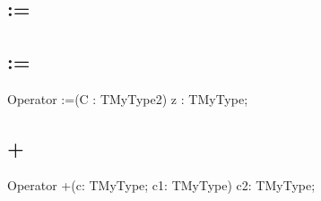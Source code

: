\documentclass{report}
\newif\ifpdf
\begin{document}
\subsection*{\large{\textbf{:=}}\normalsize\hspace{1ex}\hrulefill}
\else
\subsection*{:=}
\fi
\label{ok_operator_test-:=}
\index{:=}
\begin{list}{}{
\setlength{\itemindent}{0cm}
\setlength{\listparindent}{0cm}
\setlength{\leftmargin}{\evensidemargin}
\addtolength{\leftmargin}{\tmplength}
\settowidth{\labelsep}{X}
\addtolength{\leftmargin}{\labelsep}
\setlength{\labelwidth}{\tmplength}
}
\item[\textbf{Declaration}\hfill]
\ifpdf
\begin{flushleft}
\fi
\begin{ttfamily}
Operator :=(C : TMyType2) z : TMyType;\end{ttfamily}

\ifpdf
\end{flushleft}
\fi

\end{list}
\ifpdf
\subsection*{\large{\textbf{+}}\normalsize\hspace{1ex}\hrulefill}
\else
\subsection*{+}
\fi
\label{ok_operator_test-+}
\index{+}
\begin{list}{}{
\setlength{\itemindent}{0cm}
\setlength{\listparindent}{0cm}
\setlength{\leftmargin}{\evensidemargin}
\addtolength{\leftmargin}{\tmplength}
\settowidth{\labelsep}{X}
\addtolength{\leftmargin}{\labelsep}
\setlength{\labelwidth}{\tmplength}
}
\item[\textbf{Declaration}\hfill]
\ifpdf
\begin{flushleft}
\fi
\begin{ttfamily}
Operator +(c: TMyType; c1: TMyType) c2: TMyType;\end{ttfamily}

\ifpdf
\end{flushleft}
\fi

\end{list}
\ifpdf
\end{document}
